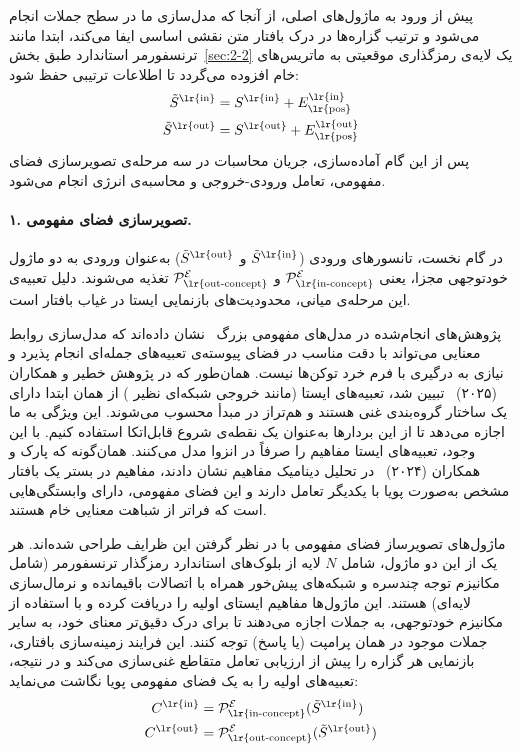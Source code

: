 پیش از ورود به ماژول‌های اصلی، از آنجا که مدل‌سازی ما در سطح جملات انجام می‌شود و ترتیب گزاره‌ها در درک بافتار متن نقشی اساسی ایفا می‌کند، ابتدا مانند ترنسفورمر استاندارد طبق بخش~\ref{sec:2-2} یک لایه‌ی رمزگذاری موقعیتی به ماتریس‌های خام افزوده می‌گردد تا اطلاعات ترتیبی حفظ شود:
\begin{align}
    \tilde{S}^{\text{\lr{in}}} &= S^{\text{\lr{in}}} + E_{\text{\lr{pos}}}^{\text{\lr{in}}} \label{eq:chap4_pos_enc_in} \\
    \tilde{S}^{\text{\lr{out}}} &= S^{\text{\lr{out}}} + E_{\text{\lr{pos}}}^{\text{\lr{out}}} \label{eq:chap4_pos_enc_out}
\end{align}
پس از این گام آماده‌سازی، جریان محاسبات در سه مرحله‌ی تصویرسازی فضای مفهومی، تعامل ورودی-خروجی و محاسبه‌ی انرژی انجام می‌شود.

\paragraph{۱. تصویرسازی فضای مفهومی.}
در گام نخست، تانسورهای ورودی ($\tilde{S}^{\text{\lr{in}}}$ و $\tilde{S}^{\text{\lr{out}}}$) به‌عنوان ورودی به دو ماژول خودتوجهی مجزا، یعنی $\mathcal{P}_{\text{\lr{in-concept}}}^{\mathcal{E}}$ و $\mathcal{P}_{\text{\lr{out-concept}}}^{\mathcal{E}}$ تغذیه می‌شوند. دلیل تعبیه‌ی این مرحله‌ی میانی، محدودیت‌های بازنمایی ایستا در غیاب بافتار است.

پژوهش‌های انجام‌شده در مدل‌های مفهومی بزرگ~\cite{lcmteam2024lcm} نشان داده‌اند که مدل‌سازی روابط معنایی می‌تواند با دقت مناسب در فضای پیوسته‌ی تعبیه‌های جمله‌ای انجام پذیرد و نیازی به درگیری با فرم خرد توکن‌ها نیست. همان‌طور که در پژوهش خطیر و همکاران (۲۰۲۵)~\cite{khatir2025aligned} تبیین شد، تعبیه‌های ایستا (مانند خروجی شبکه‌ای نظیر ) از همان ابتدا دارای یک ساختار گروه‌بندی غنی هستند و هم‌تراز در مبدأ محسوب می‌شوند. این ویژگی به ما اجازه می‌دهد تا از این بردارها به‌عنوان یک نقطه‌ی شروع قابل‌اتکا استفاده کنیم. با این وجود، تعبیه‌های ایستا مفاهیم را صرفاً در انزوا مدل می‌کنند. همان‌گونه که پارک و همکاران (۲۰۲۴)~\cite{park2024emergence} در تحلیل دینامیک مفاهیم نشان دادند، مفاهیم در بستر یک بافتار مشخص به‌صورت پویا با یکدیگر تعامل دارند و این فضای مفهومی، دارای وابستگی‌هایی است که فراتر از شباهت معنایی خام هستند.

ماژول‌های تصویرساز فضای مفهومی با در نظر گرفتن این ظرایف طراحی شده‌اند. هر یک از این دو ماژول، شامل $N$ لایه از بلوک‌های استاندارد رمزگذار ترنسفورمر (شامل مکانیزم توجه چندسره و شبکه‌های پیش‌خور همراه با اتصالات باقیمانده و نرمال‌سازی لایه‌ای) هستند. این ماژول‌ها مفاهیم ایستای اولیه را دریافت کرده و با استفاده از مکانیزم خودتوجهی، به جملات اجازه می‌دهند تا برای درک دقیق‌تر معنای خود، به سایر جملات موجود در همان پرامپت (یا پاسخ) توجه کنند. این فرایند زمینه‌سازی بافتاری، بازنمایی هر گزاره را پیش از ارزیابی تعامل متقاطع غنی‌سازی می‌کند و در نتیجه، تعبیه‌های اولیه را به یک فضای مفهومی پویا نگاشت می‌نماید:
\begin{align}
    C^{\text{\lr{in}}} &= \mathcal{P}_{\text{\lr{in-concept}}}^{\mathcal{E}}(\tilde{S}^{\text{\lr{in}}}) \label{eq:chap4_concept_in} \\
    C^{\text{\lr{out}}} &= \mathcal{P}_{\text{\lr{out-concept}}}^{\mathcal{E}}(\tilde{S}^{\text{\lr{out}}}) \label{eq:chap4_concept_out}
\end{align}

